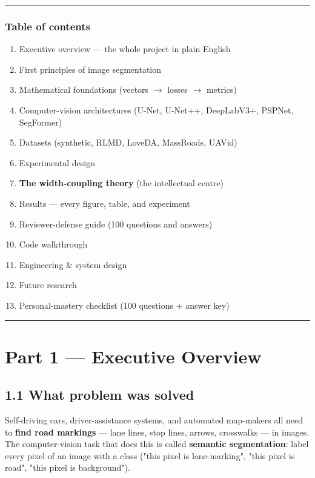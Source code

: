 \documentclass[11pt]{article}
\begin{document}
\vspace{3pt}\hrule\vspace{3pt}

\subsubsection*{Table of contents}

\begin{enumerate}\setlength{\itemsep}{1pt}
\item Executive overview --- the whole project in plain English
\item First principles of image segmentation
\item Mathematical foundations (vectors $\rightarrow$ losses $\rightarrow$ metrics)
\item Computer-vision architectures (U-Net, U-Net++, DeepLabV3+, PSPNet, SegFormer)
\item Datasets (synthetic, RLMD, LoveDA, MassRoads, UAVid)
\item Experimental design
\item \textbf{The width-coupling theory} (the intellectual centre)
\item Results --- every figure, table, and experiment
\item Reviewer-defense guide (100 questions and answers)
\item Code walkthrough
\item Engineering \& system design
\item Future research
\item Personal-mastery checklist (100 questions + answer key)
\end{enumerate}

\vspace{3pt}\hrule\vspace{3pt}
\clearpage\section*{Part 1 --- Executive Overview}

\subsection*{1.1 What problem was solved}

Self-driving cars, driver-assistance systems, and automated map-makers all need to \textbf{find road markings} --- lane lines, stop lines, arrows, crosswalks --- in images. The computer-vision task that does this is called \textbf{semantic segmentation}: label every pixel of an image with a class ("this pixel is lane-marking", "this pixel is road", "this pixel is background").
\end{document}

